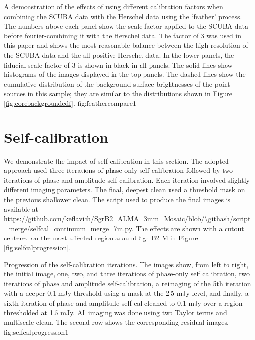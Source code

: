 \documentclass[twocolumn]{aastex61}
\begin{document}
{A demonstration of the effects of using different calibration factors when
combining the SCUBA data with the Herschel data using the `feather' process.
The numbers above each panel show the scale factor applied to the SCUBA data
before fourier-combining it with the Herschel data.  The factor of 3 was used
in this paper and shows the most reasonable balance between the high-resolution
of the SCUBA data and the all-positive Herschel data.  In the lower panels, the
fiducial scale factor of 3 is shown in black in all panels.  The solid lines
show histograms of the images displayed in the top panels.  The dashed lines
show the cumulative distribution of the background surface brightnesses of the
point sources in this sample; they are similar to the distributions shown in
Figure \ref{fig:corebackgroundcdf}.}
{fig:feathercompare}{1}{\textwidth}

\section{Self-calibration}
\label{sec:selfcal}
We demonstrate the impact of self-calibration in this section.  The adopted approach
used three iterations of phase-only self-calibration followed by two iterations of
phase and amplitude self-calibration.  Each iteration involved slightly
different imaging parameters.  The final, deepest clean used a threshold mask
on the previous shallower clean. The script used to produce the final images is
available at
\url{https://github.com/keflavich/SgrB2_ALMA_3mm_Mosaic/blob/\githash/script_merge/selfcal_continuum_merge_7m.py}.
The effects are shown with a cutout centered on the most affected region around
Sgr B2 M in Figure \ref{fig:selfcalprogression}.

{Progression of the self-calibration iterations.  The images show, from left to
right, the initial image, one, two, and three iterations of phase-only self
calibration, two iterations of phase and amplitude self-calibration,  a
reimaging of the 5th iteration with a deeper 0.1 mJy threshold using a mask at
the 2.5 mJy level, and finally, a sixth iteration of phase and amplitude
self-cal cleaned to 0.1 mJy over a region thresholded at 1.5 mJy.  All imaging
was done using two Taylor terms and multiscale clean.  The second row shows the
corresponding residual images.}
{fig:selfcalprogression}{1}{\textwidth}
\end{document}
